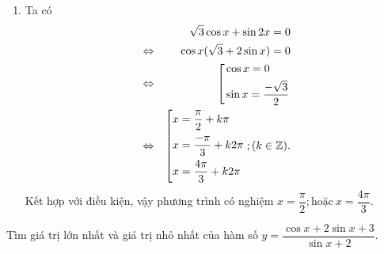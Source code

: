 \begin{bt}
{\begin{enumerate}
\item Ta có
{\allowdisplaybreaks
\begin{eqnarray*}
	&&\sqrt{3} \cos x+ \sin 2x= 0 \\
	&\Leftrightarrow & \cos x(\sqrt{3}+ 2 \sin x)= 0\\
	&\Leftrightarrow  & \left[\begin{aligned}&\cos x= 0\\ &\sin x= \dfrac{-\sqrt{3}}{2}\end{aligned}\right.\\
	& \Leftrightarrow & \left[\begin{aligned}&x= \dfrac{\pi}{2}+ k \pi\\&x= \dfrac{-\pi}{3}+ k2 \pi\\&x= \dfrac{4 \pi}{3}+ k2 \pi\end{aligned}\right.; (k \in \mathbb{Z}).
\end{eqnarray*}}
Kết hợp với điều kiện, vậy phương trình có nghiệm $x= \dfrac{\pi}{2};\text{hoặc}\ x= \dfrac{4 \pi}{3}.$
		\end{enumerate}	
	}
\end{bt}

\begin{bt}%
	Tìm giá trị lớn nhất và giá trị nhỏ nhất của hàm số $y= \dfrac{\cos x+ 2\sin x+ 3}{\sin x+ 2}$.
\end{bt}


